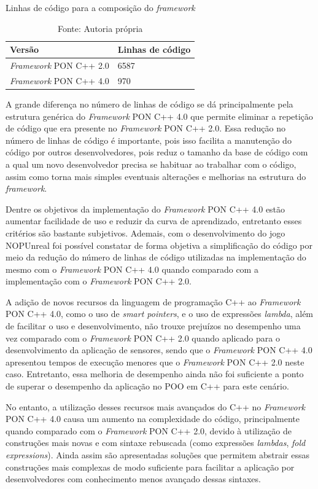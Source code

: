 \begin{table}[!htb]
\centering
\caption{Linhas de código para a composição do \textit{framework}}
\smallskip
\begin{tabularx}{0.8\textwidth}{|X|X|}
\hline
Versão & Linhas de código\\
\hline
\textit{Framework} PON C++ 2.0 & 6587 \\
\hline
\textit{Framework} PON C++ 4.0 & 970 \\
\hline
\end{tabularx}
\caption*{Fonte: Autoria própria}
\label{tab:linhas_de_codigo}
\end{table}

A grande diferença no número de linhas de código se dá principalmente pela
estrutura genérica do \textit{Framework} PON C++ 4.0 que permite eliminar a
repetição de código que era presente no \textit{Framework} PON C++ 2.0. Essa
redução no número de linhas de código é importante, pois isso facilita a
manutenção do código por outros desenvolvedores, pois reduz o tamanho da base de
código com a qual um novo desenvolvedor precisa se habituar ao trabalhar com o
código, assim como torna mais simples eventuais alterações e melhorias na
estrutura do \textit{framework}.

Dentre os objetivos da implementação do \textit{Framework} PON C++ 4.0 estão
aumentar facilidade de uso e reduzir da curva de aprendizado, entretanto esses
critérios são bastante subjetivos. Ademais, com o desenvolvimento do jogo
NOPUnreal foi possível constatar de forma objetiva a simplificação do código por
meio da redução do número de linhas de código utilizadas na implementação do
mesmo com o \textit{Framework} PON C++ 4.0 quando comparado com a implementação
com o \textit{Framework} PON C++ 2.0.

A adição de novos recursos da linguagem de programação C++ ao \textit{Framework}
PON C++ 4.0, como o uso de \textit{smart pointers}, e o uso de expressões
\textit{lambda}, além de facilitar o uso e desenvolvimento, não trouxe prejuízos
no desempenho uma vez comparado com o \textit{Framework} PON C++ 2.0 quando
aplicado para o desenvolvimento da aplicação de sensores, sendo que o
\textit{Framework} PON C++ 4.0 apresentou tempos de execução menores que o
\textit{Framework} PON C++ 2.0 neste caso. Entretanto, essa melhoria de
desempenho ainda não foi suficiente a ponto de superar o desempenho da aplicação
no POO em C++ para este cenário.

No entanto, a utilização desses recursos mais avançados do C++ no
\textit{Framework} PON C++ 4.0 causa um aumento na complexidade do código,
principalmente quando comparado com o \textit{Framework} PON C++ 2.0, devido à
utilização de construções mais novas e com sintaxe rebuscada (como expressões
\textit{lambdas}, \textit{fold expressions}). Ainda assim são apresentadas
soluções que permitem abstrair essas construções mais complexas de modo
suficiente para facilitar a aplicação por desenvolvedores com conhecimento menos
avançado dessas sintaxes.

